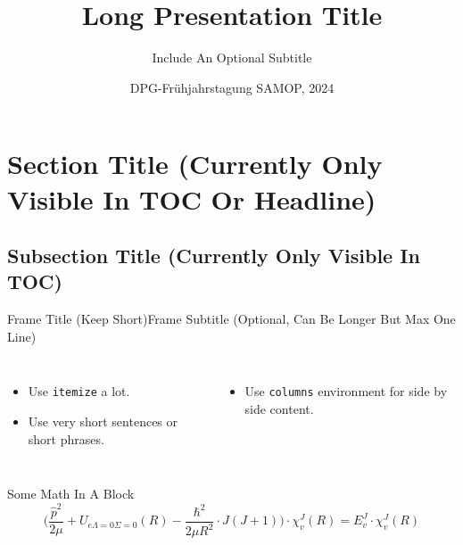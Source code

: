 \documentclass[aspectratio=1610,12pt]{beamer}
\title[Short Title]%
{Long Presentation Title}
\subtitle
{Include An Optional Subtitle}
\author[F.~Author] %
{\texorpdfstring{\underline{First~Author}\inst{1} \and Second~Author\inst{1} \and Third~Author\inst{2} \and Fourth~Author\inst{2}}{First Author, Second Author, Third Author, Fourth Author}}
\institute[Uni Kassel] %
{
  \inst{1}%
  Institute of Physics and CINSaT\\
  University of Kassel
  \and
  \inst{2}%
  Department of Something\\
  University of Somewhere}
\date[DPG 2024] %
{DPG-Frühjahrstagung SAMOP, 2024}
\begin{document}
\begin{frame}
  \titlepage
\end{frame}






\section{Section Title (Currently Only Visible In TOC Or Headline)}

\subsection{Subsection Title (Currently Only Visible In TOC)}

\begin{frame}{Frame Title (Keep Short)}{Frame Subtitle (Optional, Can Be Longer But Max One Line)}
  \begin{columns}
    \begin{itemize}
      \item Use \texttt{itemize} a lot.
      \item Use very short sentences or short phrases.
    \end{itemize}
    \begin{itemize}
      \item Use \texttt{columns} environment for side by side content.
    \end{itemize}
  \end{columns}
  \begin{block}{Some Math In A Block}
    \begin{equation}
      \biggl(\frac{\hat{p}^2}{2 \mu} + U_{e \Lambda=0 \Sigma=0}\left(R\right) - \frac{\hbar^2}{2 \mu R^2} \cdot J \left(J + 1\right) \biggr) \cdot \chi^J_v\left(R\right) = E^J_v \cdot \chi^J_v\left(R\right)
    \end{equation}
  \end{block}
\end{frame}
\end{document}
